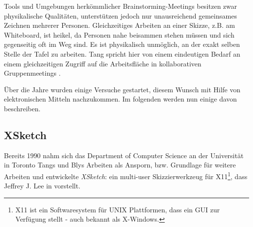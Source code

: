 
Tools und Umgebungen herkömmlicher Brainstorming-Meetings besitzen zwar physikalische Qualitäten, unterstützen jedoch nur unausreichend gemeinsames Zeichnen mehrerer Personen. Gleichzeitiges Arbeiten an einer Skizze, z.B. am Whiteboard, ist heikel, da Personen nahe beisammen stehen müssen und sich gegenseitig oft im Weg sind. Es ist physikalisch unmöglich, an der exakt selben Stelle der Tafel zu arbeiten. Tang spricht hier von einem eindeutigen Bedarf an einem gleichzeitigen Zugriff auf die Arbeitsfläche in kollaborativen Gruppenmeetings \citep{Tang1991143}.

Über die Jahre wurden einige Versuche gestartet, diesem Wunsch mit Hilfe von elektronischen Mitteln nachzukommen. Im folgenden werden nun einige davon beschreiben.

\subsection{XSketch} 
Bereits 1990 nahm sich das Department of Computer Science an der Universität in Toronto Tangs und Blys Arbeiten als Ansporn, bzw. Grundlage für weitere Arbeiten und entwickelte \emph{XSketch}: ein multi-user Skizzierwerkzeug für X11\footnote{X11 ist ein Softwaresystem für UNIX Plattformen, dass ein \ac{GUI} zur Verfügung stellt - auch bekannt als X-Windows.}, dass Jeffrey J. Lee in \citep{Lee:1990:XMS:91478.91510} vorstellt.

